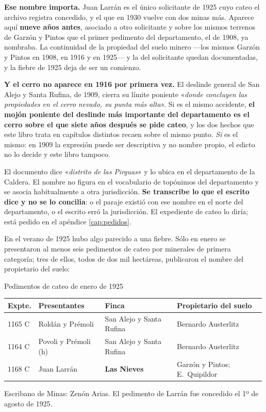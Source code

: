 \textbf{Ese nombre importa.} Juan Larrán es el único solicitante de 1925 cuyo
cateo el archivo registra concedido, y el que en 1930 vuelve con dos minas más. Aparece aquí
\textbf{nueve años antes}, asociado a otro solicitante y sobre los mismos terrenos de Garzón y Pintos
que el primer pedimento del departamento, el de 1908, ya nombraba. La continuidad de la propiedad del
suelo minero ---los mismos Garzón y Pintos en 1908, en 1916 y en 1925--- y la del solicitante quedan
documentadas, y la fiebre de 1925 deja de ser un comienzo.

\begin{cautela}
\textbf{Y el cerro no aparece en 1916 por primera vez.} El deslinde general de San Alejo y Santa
Rufina, de 1909, cierra su límite poniente «\textit{donde concluyen las propiedades en el cerro nevado,
su punta más alta}». Si es el mismo accidente, \textbf{el mojón poniente del deslinde más importante del
departamento es el cerro sobre el que siete años después se pide cateo}, y los dos hechos que este libro
trata en capítulos distintos recaen sobre el mismo punto. \textit{Si} es el mismo: en 1909 la expresión
puede ser descriptiva y no nombre propio, el edicto no lo decide y este libro tampoco.

El documento dice «\textit{distrito de las Pirguas}» y lo ubica en el departamento de la Caldera. El
nombre no figura en el vocabulario de topónimos del departamento y se asocia habitualmente a otra
jurisdicción. \textbf{Se transcribe lo que el escrito dice y no se lo concilia}: o el paraje existió
con ese nombre en el norte del departamento, o el escrito erró la jurisdicción. El expediente de
cateo lo diría; está pedido en el apéndice \ref{cap:pedidos}.
\end{cautela}

En el verano de 1925 hubo algo parecido a una fiebre. Sólo en enero se presentaron al menos seis pedimentos de cateo por minerales de primera categoría; tres de ellos, todos de dos mil hectáreas, publicaron el nombre del propietario del suelo:

\begin{ficha}{Pedimentos de cateo de enero de 1925}
\begin{center}\small
\begin{tabular}{@{}p{1.7cm}p{3.6cm}p{3.9cm}p{2.5cm}@{}}
\toprule
\textbf{Expte.} & \textbf{Presentantes} & \textbf{Finca} & \textbf{Propietario del suelo} \\
\midrule
1165 C & Roldán y Prémoli & San Alejo y Santa Rufina & Bernardo Austerlitz\index{Austerlitz, Bernardo} \\
1164 C & Povoli y Prémoli (h) & San Alejo y Santa Rufina & Bernardo Austerlitz\index{Austerlitz, Bernardo} \\
1168 C & Juan Larrán & \textbf{Las Nieves} & Garzón y Pintos; E.\ Quipildor \\
\bottomrule
\end{tabular}
\end{center}
Escribano de Minas: Zenón Arias. El pedimento de Larrán fue concedido el 1º de agosto de
1925.
\end{ficha}

